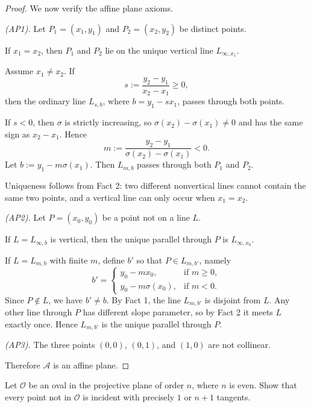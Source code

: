\documentclass[11pt, a4paper]{ctexrep}
\begin{document}
\begin{proof}
    \medskip
    We now verify the affine plane axioms.

    \emph{(AP1).} Let \(P_1=(x_1,y_1)\) and \(P_2=(x_2,y_2)\) be distinct points.

    If \(x_1=x_2\), then \(P_1\) and \(P_2\) lie on the unique vertical line \(L_{\infty,x_1}\).

    Assume \(x_1\ne x_2\). If
    \[
        s:=\frac{y_2-y_1}{x_2-x_1}\ge 0,
    \]
    then the ordinary line \(L_{s,b}\), where \(b=y_1-sx_1\), passes through both points.

    If \(s<0\), then \(\sigma\) is strictly increasing, so \(\sigma(x_2)-\sigma(x_1)\ne 0\) and has the same
    sign as \(x_2-x_1\). Hence
    \[
        m:=\frac{y_2-y_1}{\sigma(x_2)-\sigma(x_1)}<0.
    \]
    Let \(b:=y_1-m\sigma(x_1)\). Then \(L_{m,b}\) passes through both \(P_1\) and \(P_2\).

    Uniqueness follows from Fact 2: two different nonvertical lines cannot contain the same two points, and a
    vertical line can only occur when \(x_1=x_2\).

    \emph{(AP2).} Let \(P=(x_0,y_0)\) be a point not on a line \(L\).

    If \(L=L_{\infty,b}\) is vertical, then the unique parallel through \(P\) is \(L_{\infty,x_0}\).

    If \(L=L_{m,b}\) with finite \(m\), define \(b'\) so that \(P\in L_{m,b'}\), namely
    \[
        b'=
        \begin{cases}
            y_0-mx_0,            & \text{if } m\ge 0, \\
            y_0-m\sigma(x_0),    & \text{if } m<0.
        \end{cases}
    \]
    Since \(P\notin L\), we have \(b'\ne b\). By Fact 1, the line \(L_{m,b'}\) is disjoint from \(L\).
    Any other line through \(P\) has different slope parameter, so by Fact 2 it meets \(L\) exactly once.
    Hence \(L_{m,b'}\) is the unique parallel through \(P\).

    \emph{(AP3).} The three points \((0,0)\), \((0,1)\), and \((1,0)\) are not collinear.

    Therefore \(\mathcal{A}\) is an affine plane.
\end{proof}

\begin{exercise}
    Let $\mathcal{O}$ be an oval in the projective plane of order $n$, where $n$ is even.
    Show that every point not in $\mathcal{O}$ is incident with precisely $1$ or $n+1$ tangents.
\end{exercise}
\end{document}
